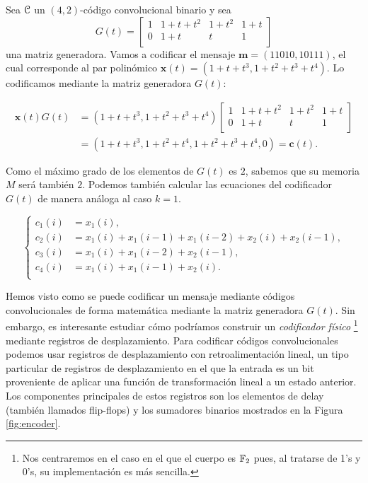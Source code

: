 \begin{ejemplo}
Sea $\mathcal C$ un $(4,2)$-código convolucional binario y sea $$G(t) = \left[ \begin{array}{cccc}
    1 & 1 + t + t^2 & 1 + t^2 & 1 + t \\
    0 & 1 + t & t & 1 \\
    \end{array} \right]$$ 
una matriz generadora. Vamos a codificar el mensaje $\mathbf{m} = (11010,10111)$, el cual corresponde al par polinómico $\mathbf{x}(t) = (1 + t + t^3,1 + t^2 + t^3 + t^4)$. Lo codificamos mediante la matriz generadora $G(t)$:

\begin{align*}
    \mathbf{x}(t)G(t) &= (1 + t + t^3, 1 + t^2 + t^3 + t^4) \left[ \begin{array}{cccc}
        1 & 1 + t + t^2 & 1 + t^2 & 1 + t \\
        0 & 1 + t & t & 1 \\
    \end{array} \right] \\
    &= (1 + t + t^3, 1 + t^2 + t^4, 1 + t^2 + t^3 + t^4, 0 ) = \mathbf{c}(t).
    \end{align*}

Como el máximo grado de los elementos de $G(t)$ es $2$, sabemos que su memoria $M$ será también $2$. Podemos también calcular las ecuaciones del codificador $G(t)$ de manera análoga al caso $k=1$.

\[
\left\{
\begin{aligned}
    c_1(i) &= x_1(i), \\
    c_2(i) &= x_1(i) + x_1(i-1) + x_1(i-2) + x_2(i) + x_2(i-1),   \\
    c_3(i) &= x_1(i) + x_1(i-2) + x_2(i-1),\\
    c_4(i) &= x_1(i) + x_1(i-1) + x_2(i).\\
\end{aligned}
\right.
\]
\end{ejemplo}

Hemos visto como se puede codificar un mensaje mediante códigos convolucionales de forma matemática mediante la matriz generadora $G(t)$. Sin embargo, es interesante estudiar cómo podríamos construir un \emph{codificador físico} \footnote{Nos centraremos en el caso en el que el cuerpo es $\mathbb{F}_2$ pues, al tratarse de 1's y 0's, su implementación es más sencilla. } mediante registros de desplazamiento. Para codificar códigos convolucionales podemos usar registros de desplazamiento con retroalimentación lineal, un tipo particular de registros de desplazamiento en el que la entrada es un bit proveniente de aplicar una función de transformación lineal a un estado anterior. Los componentes principales de estos registros son los elementos de delay (también llamados flip-flops) y los sumadores binarios mostrados en la Figura \ref{fig:encoder}.

